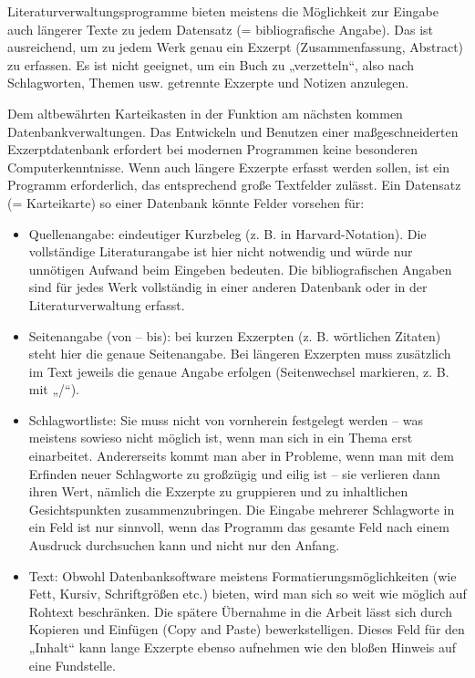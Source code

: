 \documentclass[]{book}
\providecommand{\tightlist}{%
  \setlength{\itemsep}{0pt}\setlength{\parskip}{0pt}}
\theoremstyle{definition}
\theoremstyle{definition}
\theoremstyle{definition}
\theoremstyle{remark}
\begin{document}
Literaturverwaltungsprogramme bieten meistens die Möglichkeit zur
Eingabe auch längerer Texte zu jedem Datensatz (= bibliografische
Angabe). Das ist ausreichend, um zu jedem Werk genau ein Exzerpt
(Zusammenfassung, Abstract) zu erfassen. Es ist nicht geeignet, um ein
Buch zu „verzetteln``, also nach Schlagworten, Themen usw. getrennte
Exzerpte und Notizen anzulegen.

Dem altbewährten Karteikasten in der Funktion am nächsten kommen
Datenbankverwaltungen. Das Entwickeln und Benutzen einer
maßgeschneiderten Exzerptdatenbank erfordert bei modernen Programmen
keine besonderen Computerkenntnisse. Wenn auch längere Exzerpte erfasst
werden sollen, ist ein Programm erforderlich, das entsprechend große
Textfelder zulässt. Ein Datensatz (= Karteikarte) so einer Datenbank
könnte Felder vorsehen für:

\begin{itemize}
\tightlist
\item
  Quellenangabe: eindeutiger Kurzbeleg (z. B. in Harvard-Notation). Die
  vollständige Literaturangabe ist hier nicht notwendig und würde nur
  unnötigen Aufwand beim Eingeben bedeuten. Die bibliografischen Angaben
  sind für jedes Werk vollständig in einer anderen Datenbank oder in der
  Literaturverwaltung erfasst.
\item
  Seitenangabe (von -- bis): bei kurzen Exzerpten (z. B. wörtlichen
  Zitaten) steht hier die genaue Seitenangabe. Bei längeren Exzerpten
  muss zusätzlich im Text jeweils die genaue Angabe erfolgen
  (Seitenwechsel markieren, z. B. mit „/``).
\item
  Schlagwortliste: Sie muss nicht von vornherein festgelegt werden --
  was meistens sowieso nicht möglich ist, wenn man sich in ein Thema
  erst einarbeitet. Andererseits kommt man aber in Probleme, wenn man
  mit dem Erfinden neuer Schlagworte zu großzügig und eilig ist -- sie
  verlieren dann ihren Wert, nämlich die Exzerpte zu gruppieren und zu
  inhaltlichen Gesichtspunkten zusammenzubringen. Die Eingabe mehrerer
  Schlagworte in ein Feld ist nur sinnvoll, wenn das Programm das
  gesamte Feld nach einem Ausdruck durchsuchen kann und nicht nur den
  Anfang.
\item
  Text: Obwohl Datenbanksoftware meistens Formatierungsmöglichkeiten
  (wie Fett, Kursiv, Schriftgrößen etc.) bieten, wird man sich so weit
  wie möglich auf Rohtext beschränken. Die spätere Übernahme in die
  Arbeit lässt sich durch Kopieren und Einfügen (Copy and Paste)
  bewerkstelligen. Dieses Feld für den „Inhalt`` kann lange Exzerpte
  ebenso aufnehmen wie den bloßen Hinweis auf eine Fundstelle.
\end{itemize}
\end{document}

